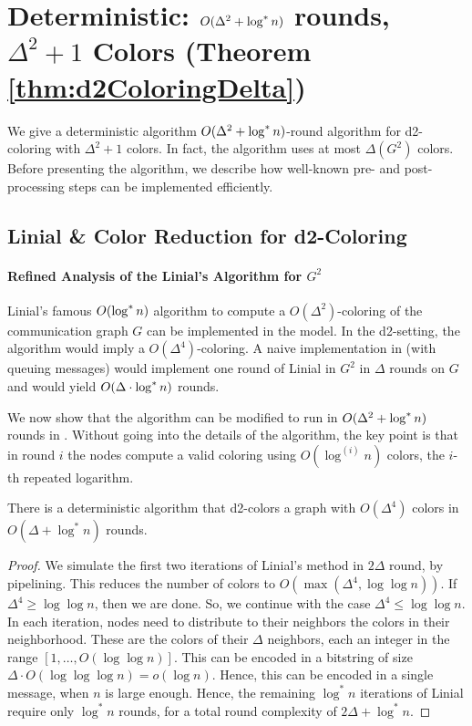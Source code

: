 \section{Deterministic: $O(\Delta^2+\log^* n)$ rounds, $\Delta^2+1$ Colors (Theorem \ref{thm:d2ColoringDelta})}
\label{sec:g2-coloring}

We give a deterministic algorithm $O(\Delta^2+\log^* n)$-round algorithm for d2-coloring with $\Delta^2+1$ colors. In fact, the algorithm uses at most $\Delta(G^2)$ colors. Before presenting the algorithm, we describe how well-known pre- and post-processing steps can be implemented efficiently.

\subsection{Linial \& Color Reduction for d2-Coloring}
\paragraph{Refined Analysis of the Linial's Algorithm for $G^2$}

Linial's famous  $O(\log^* n)$ algorithm to compute a $O(\Delta^2)$-coloring of the communication graph $G$ can be implemented in the {\congest} model. In the d2-setting, the algorithm would imply a $O(\Delta^4)$-coloring. A naive implementation in {\congest} (with queuing messages) would implement one round of Linial in $G^2$ in $\Delta$ rounds on $G$ and would yield $O(\Delta\cdot \log^* n)$ rounds. 

We now show that the algorithm can be modified to run in $O(\Delta^2+\log^* n)$ rounds in {\congest}.
Without going into the details of the algorithm, the key point is that in round $i$ the nodes compute a valid coloring using $O(\log^{(i)} n)$ colors, the $i$-th repeated logarithm. 
\begin{theorem}
\label{thm:Liniald2}
There is a deterministic {\congest} algorithm that d2-colors a graph with $O(\Delta^4)$ colors in $O(\Delta + \log^* n)$  rounds.
\end{theorem}

\begin{proof}
We simulate the first two iterations of Linial's method in $2\Delta$ round, by pipelining.
This reduces the number of colors to $O(\max(\Delta^4, \log\log n))$. 
If $\Delta^4 \ge \log\log n$, then we are done.
So, we continue with the case $\Delta^4 \le \log\log n$.
In each iteration, nodes need to distribute to their neighbors the colors in their neighborhood.
These are the colors of their $\Delta$ neighbors, each an integer in the range $[1,\ldots, O(\log\log n)]$. This can be encoded in a bitstring of size $\Delta \cdot O(\log\log\log n) = o(\log n)$. Hence, this can be encoded in a single {\congest} message, when $n$ is large enough.
Hence, the remaining $\log^* n$ iterations of Linial require only $\log^* n$ rounds, for a total round complexity of $2\Delta + \log^* n$.
\end{proof}

